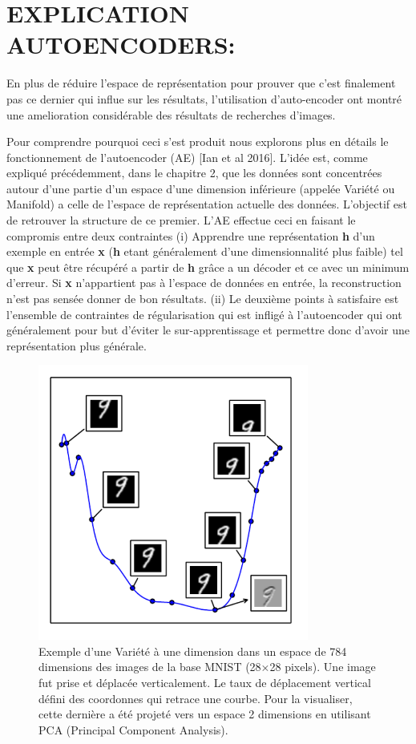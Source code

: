 \section{EXPLICATION AUTOENCODERS:}
En plus de réduire l'espace de représentation pour prouver que c'est finalement pas ce dernier qui influe sur les résultats, l'utilisation d'auto-encoder ont montré une amelioration considérable des résultats de recherches d'images.

Pour comprendre pourquoi ceci s'est produit nous explorons plus en détails le fonctionnement de l'autoencoder (AE) [Ian et al 2016]. L’idée est, comme expliqué précédemment, dans le chapitre 2, que les données sont concentrées autour d'une partie d'un espace d'une dimension inférieure (appelée Variété ou Manifold) a celle de l'espace de représentation actuelle des données. L'objectif est de retrouver la structure de ce premier. L'AE effectue ceci en faisant le compromis entre deux contraintes (i) Apprendre une représentation \textbf{h} d'un exemple en entrée \textbf{x} (\textbf{h} etant généralement d'une dimensionnalité plus faible) tel que \textbf{x} peut être récupéré a partir de \textbf{h} grâce a un décoder et ce avec un minimum d'erreur. Si \textbf{x} n'appartient pas à l'espace de données en entrée, la reconstruction n'est pas sensée donner de bon résultats. (ii) Le deuxième points à satisfaire est l'ensemble de contraintes de régularisation qui est infligé à l'autoencoder qui ont généralement pour but d’éviter le sur-apprentissage et permettre donc d'avoir une représentation plus générale.


\begin{figure}[H]
	\centering
		\includegraphics[width=3.5in]{Figures/manifold.png}
	\caption[Res]{Exemple d'une Variété à une dimension dans un espace de 784 dimensions des images de la base MNIST (28×28 pixels). Une image fut prise et déplacée verticalement. Le taux de déplacement vertical défini des coordonnes qui retrace une courbe. Pour la visualiser, cette dernière a été projeté vers un espace 2 dimensions en utilisant PCA (Principal Component Analysis). }
	\label{fig:Electron}
\end{figure}


